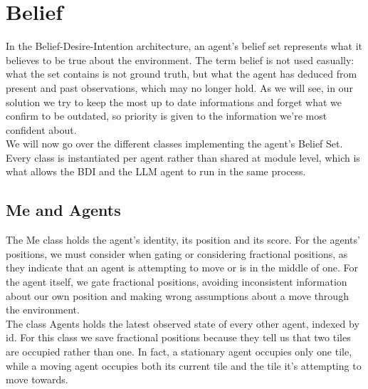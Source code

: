 \documentclass[11pt,a4paper]{article}
\begin{document}
\section{Belief}
In the Belief-Desire-Intention architecture, an agent's belief set represents what it believes to be true about the environment. 
The term belief is not used casually: what the set contains is not ground truth, but what the agent has deduced from present and past observations, which may no longer hold.
As we will see, in our solution we try to keep the most up to date informations and forget what we confirm to be outdated, so priority is given to the information we're most confident about.
\\We will now go over the different classes implementing the agent's Belief Set.
Every class is instantiated per agent rather than shared at module level, which is what allows the BDI and the LLM agent to run in the same process.

\subsection{Me and Agents}
The Me class holds the agent's identity, its position and its score.
For the agents' positions, we must consider when gating or considering fractional positions, as they indicate that an agent is attempting to move or is in the middle of one. 
For the agent itself, we gate fractional positions, avoiding inconsistent information about our own position and making wrong assumptions about a move through the environment.
\\The class Agents holds the latest observed state of every other agent, indexed by id.
For this class we save fractional positions because they tell us that two tiles are occupied rather than one.
In fact, a stationary agent occupies only one tile, while a moving agent occupies both its current tile and the tile it's attempting to move towards.
\end{document}
